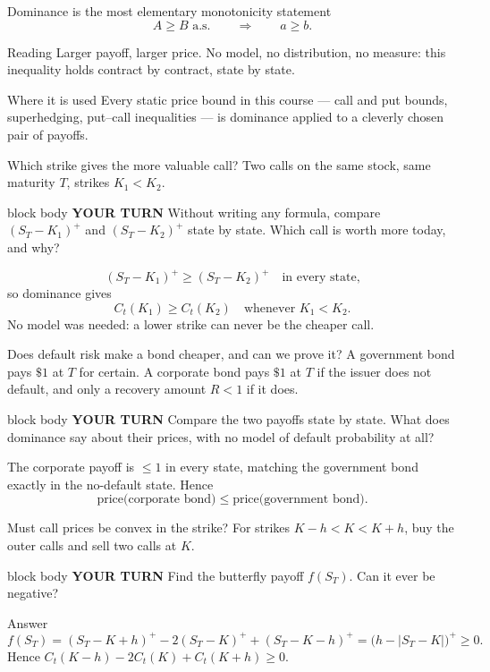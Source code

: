 \documentclass[handout,10pt,aspectratio=169]{beamer}
\newenvironment{pausebox}{\begin{beamercolorbox}[rounded=true,sep=0.8em,wd=\textwidth]{block body}
  \textbf{\color{CourseGold}YOUR TURN}\quad}{\end{beamercolorbox}}
\newcommand{\1}{\mathbf 1}
\begin{document}
\begin{frame}{Dominance is the most elementary monotonicity statement}
\[
A\geq B\text{ a.s.}
\qquad\Longrightarrow\qquad
\boxed{a\geq b.}
\]
\begin{block}{Reading}
Larger payoff, larger price. No model, no distribution, no measure: this
inequality holds contract by contract, state by state.
\end{block}
\begin{exampleblock}{Where it is used}
Every static price bound in this course --- call and put bounds, superhedging,
put--call inequalities --- is dominance applied to a cleverly chosen pair of
payoffs.
\end{exampleblock}
\end{frame}

\begin{frame}{Which strike gives the more valuable call?}
Two calls on the same stock, same maturity \(T\), strikes \(K_1<K_2\).
\begin{pausebox}
Without writing any formula, compare \((S_T-K_1)^+\) and \((S_T-K_2)^+\)
state by state. Which call is worth more today, and why?
\end{pausebox}

\[
(S_T-K_1)^+\geq(S_T-K_2)^+
\quad\text{in every state,}
\]
so dominance gives
\[
\boxed{C_t(K_1)\geq C_t(K_2)\quad\text{whenever }K_1<K_2.}
\]
No model was needed: a lower strike can never be the cheaper call.
\end{frame}

\begin{frame}{Does default risk make a bond cheaper, and can we prove it?}
A government bond pays \(\$1\) at \(T\) for certain. A corporate bond pays
\(\$1\) at \(T\) if the issuer does not default, and only a recovery amount
\(R<1\) if it does.
\begin{pausebox}
Compare the two payoffs state by state. What does dominance say about their
prices, with no model of default probability at all?
\end{pausebox}

The corporate payoff is \(\leq1\) in every state, matching the government
bond exactly in the no-default state. Hence
\[
\boxed{\text{price(corporate bond)}\leq\text{price(government bond)}.}
\]
\end{frame}

\begin{frame}{Must call prices be convex in the strike?}
For strikes \(K-h<K<K+h\), buy the outer calls and sell two calls at \(K\).
\begin{pausebox}
Find the butterfly payoff \(f(S_T)\). Can it ever be negative?
\end{pausebox}

\begin{exampleblock}{Answer}
\[
f(S_T)=(S_T-K+h)^+-2(S_T-K)^++(S_T-K-h)^+
=\bigl(h-|S_T-K|\bigr)^+\geq0.
\]
Hence \(\boxed{C_t(K-h)-2C_t(K)+C_t(K+h)\geq0}\).
\end{exampleblock}
\end{frame}
\end{document}
